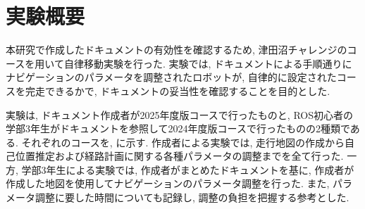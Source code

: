 \section{実験概要}
本研究で作成したドキュメントの有効性を確認するため, 津田沼チャレンジ\cite{tsudachare}のコースを用いて自律移動実験を行った. 
実験では, ドキュメントによる手順通りにナビゲーションのパラメータを調整されたロボットが, 自律的に設定されたコースを完走できるかで, ドキュメントの妥当性を確認することを目的とした. 

実験は, ドキュメント作成者が2025年度版コースで行ったものと, ROS初心者の学部3年生がドキュメントを参照して2024年度版コースで行ったものの2種類である. 
それぞれのコースを, に示す.
作成者による実験では, 走行地図の作成から自己位置推定および経路計画に関する各種パラメータの調整までを全て行った. 
一方, 学部3年生による実験では, 作成者がまとめたドキュメントを基に, 作成者が作成した地図を使用してナビゲーションのパラメータ調整を行った. 
また, パラメータ調整に要した時間についても記録し, 調整の負担を把握する参考とした. 

